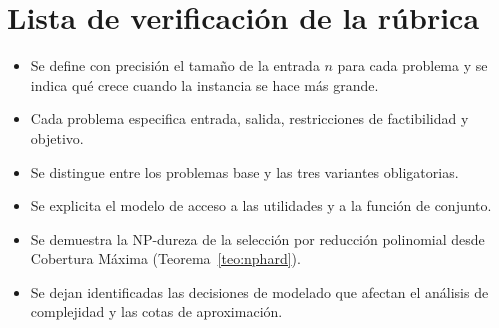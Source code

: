\documentclass[11pt,a4paper]{article}
\theoremstyle{definition}
\theoremstyle{plain}
\begin{document}
\section{Lista de verificación de la rúbrica}

\begin{itemize}[leftmargin=*,label=$\square$]
  \item Se define con precisión el tamaño de la entrada $n$ para cada problema
  y se indica qué crece cuando la instancia se hace más grande.
  \item Cada problema especifica entrada, salida, restricciones de factibilidad
  y objetivo.
  \item Se distingue entre los problemas base y las tres variantes obligatorias.
  \item Se explicita el modelo de acceso a las utilidades y a la función de
  conjunto.
  \item Se demuestra la NP-dureza de la selección por reducción polinomial
  desde Cobertura Máxima (Teorema~\ref{teo:nphard}).
  \item Se dejan identificadas las decisiones de modelado que afectan el
  análisis de complejidad y las cotas de aproximación.
\end{itemize}
\end{document}
